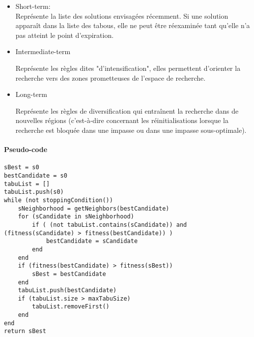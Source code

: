 \begin{itemize}
    \item Short-term: \\ 
    
    \indent     Représente la liste des solutions envisagées récemment. Si une solution apparaît dans la liste des tabous, elle ne peut être réexaminée tant qu'elle n'a pas atteint le point d'expiration. \\
      
    \item{Intermediate-term}
    
    Représente les règles dites "d'intensification", elles permettent d'orienter la recherche vers des zones prometteuses de l'espace de recherche.
    
    \item{Long-term}
    
    Représente les règles de diversification qui entraînent la recherche dans de nouvelles régions (c'est-à-dire concernant les réinitialisations lorsque la recherche est bloquée dans une impasse ou dans une impasse sous-optimale).
\end{itemize}

\newpage
\paragraph{Pseudo-code}

\begin{lstlisting}
sBest = s0
bestCandidate = s0
tabuList = []
tabuList.push(s0)
while (not stoppingCondition())
	sNeighborhood = getNeighbors(bestCandidate)
	for (sCandidate in sNeighborhood)
		if ( (not tabuList.contains(sCandidate)) and (fitness(sCandidate) > fitness(bestCandidate)) )
			bestCandidate = sCandidate
		end
	end
	if (fitness(bestCandidate) > fitness(sBest))
		sBest = bestCandidate
	end
	tabuList.push(bestCandidate)
	if (tabuList.size > maxTabuSize)
		tabuList.removeFirst()
	end
end
return sBest
\end{lstlisting}

\newpage
